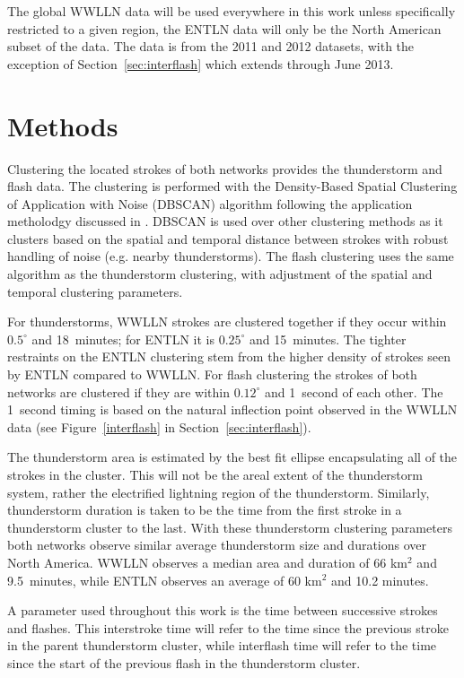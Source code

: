 The global WWLLN data will be used everywhere in this work unless specifically restricted to a given region, the ENTLN data will only be the North American subset of the data.
The data is from the 2011 and 2012 datasets, with the exception of Section~\ref{sec:interflash} which extends through June 2013.

\section{Methods}

Clustering the located strokes of both networks provides the thunderstorm and flash data.
The clustering is performed with the Density-Based Spatial Clustering of Application with Noise (DBSCAN) algorithm \citep{Ester1996, Kriegel2011a} following the application metholodgy discussed in \citet{Hutchins2014}.
DBSCAN is used over other clustering methods as it clusters based on the spatial and temporal distance between strokes with robust handling of noise (e.g. nearby thunderstorms).
The flash clustering uses the same algorithm as the thunderstorm clustering, with adjustment of the spatial and temporal clustering parameters.

For thunderstorms, WWLLN strokes are clustered together if they occur within $0.5^\circ$ and 18~minutes; for ENTLN it is $0.25^\circ$ and 15~minutes.
The tighter restraints on the ENTLN clustering stem from the higher density of strokes seen by ENTLN compared to WWLLN.
For flash clustering the strokes of both networks are clustered if they are within $0.12^\circ$ and 1~second of each other.
The 1~second timing is based on the natural inflection point observed in the WWLLN data (see Figure~\ref{interflash} in Section~\ref{sec:interflash}).

The thunderstorm area is estimated by the best fit ellipse encapsulating all of the strokes in the cluster.
This will not be the areal extent of the thunderstorm system, rather the electrified lightning region of the thunderstorm.
Similarly, thunderstorm duration is taken to be the time from the first stroke in a thunderstorm cluster to the last.
With these thunderstorm clustering parameters both networks observe similar average thunderstorm size and durations over North America.
WWLLN observes a median area and duration of 66 km$^2$ and 9.5~minutes, while ENTLN observes an average of 60 km$^2$ and 10.2 minutes.

A parameter used throughout this work is the time between successive strokes and flashes.
This interstroke time will refer to the time since the previous stroke in the parent thunderstorm cluster, while interflash time will refer to the time since the start of the previous flash in the thunderstorm cluster.

